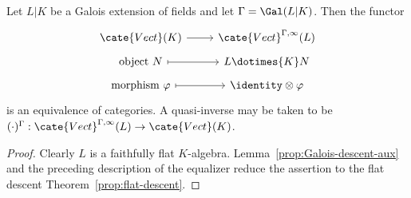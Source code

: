 \begin{theorem}\label{prop:Galois-descent}
	Let $L|K$ be a Galois extension of fields and let
	$\Gamma=\Gal(L|K)$. Then the functor
	\[\begin{tikzcd}[row sep=tiny]
		\cate{Vect}(K) \arrow[r] & \cate{Vect}^{\Gamma, \infty}(L) \\
		\text{object } N \arrow[mapsto, r] & L \dotimes{K} N \\
		\text{morphism } \varphi \arrow[mapsto, r] & \identity \otimes \varphi
	\end{tikzcd}\]
	is an equivalence of categories. A quasi-inverse may be taken to be
	$(\mathord\cdot)^\Gamma:\cate{Vect}^{\Gamma,\infty}(L)
	\to\cate{Vect}(K)$.
\end{theorem}
\begin{proof}
	Clearly $L$ is a faithfully flat $K$-algebra.
	Lemma~\ref{prop:Galois-descent-aux} and the preceding description of the
	equalizer reduce the assertion to the flat descent
	Theorem~\ref{prop:flat-descent}.
\end{proof}

